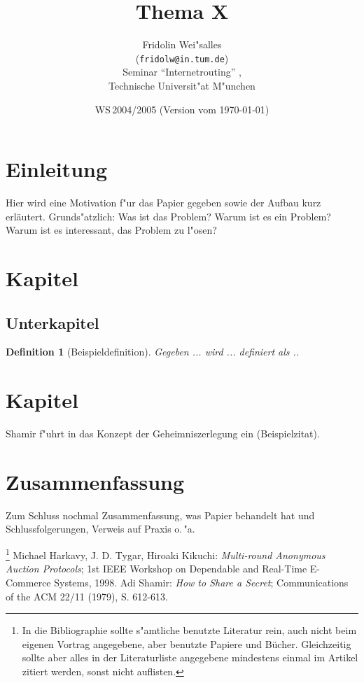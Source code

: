 \documentclass[11pt,twoside,a4paper]{article}
\newtheorem{defi}{Definition}
\begin{document}
\title{Thema X}
\author{Fridolin Wei"salles \\
  (\texttt{fridolw@in.tum.de})\\[5mm]
  Seminar "`Internetrouting"' , \\
  Technische Universit"at M"unchen
}
  
\date{WS\,2004/2005 (Version vom \today)}

\maketitle


\section{Einleitung}
Hier wird eine Motivation f"ur das Papier gegeben sowie der Aufbau kurz 
erl\"autert.  Grunds"atzlich:  Was ist das Problem?  Warum ist es ein
Problem?  Warum ist es interessant, das Problem zu l"osen?

\section{Kapitel}

\subsection{Unterkapitel}

\begin{defi}[Beispieldefinition]
Gegeben ... wird ... definiert als ..
\end{defi}

\section{Kapitel}

Shamir f"uhrt in \cite{sham79} das Konzept der Geheimniszerlegung ein 
(Beispielzitat).

\section{Zusammenfassung}
Zum Schluss nochmal Zusammenfassung, was Papier behandelt hat und 
Schlussfolgerungen, Verweis auf Praxis o.\,"a.


\begin{thebibliography}{12}
 \footnote{In die 
Bibliographie sollte s"amtliche benutzte Literatur 
rein, auch nicht beim eigenen Vortrag angegebene, aber benutzte Papiere 
und B\"ucher. Gleichzeitig sollte aber alles in der Literaturliste angegebene
mindestens einmal im Artikel zitiert werden, sonst nicht auflisten.}
        Michael Harkavy, J. D. Tygar, Hiroaki Kikuchi: {\sl Multi-round 
        Anonymous Auction Protocols}; 1st IEEE Workshop on Dependable and 
        Real-Time E-Commerce Systems, 1998.
        Adi Shamir: {\sl How to Share a Secret}; 
        Communications of the ACM 22/11 (1979), S. 612-613.
\end{thebibliography}
\end{document}
